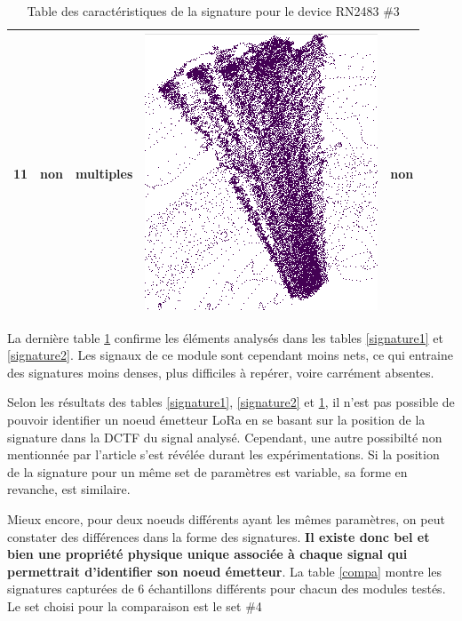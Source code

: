 \begin{table}[h]
\begin{tabular}{|c|c|c|c|c|}
\hline
11 & non & multiples & \includegraphics[scale=0.2]{images/set33.png}  & non \\
\hline
\end{tabular}
\caption{Table des caractéristiques de la signature pour le device RN2483 \#3}
\label{signature3}
\end{table}

La dernière table \ref{signature3} confirme les éléments analysés dans les tables \ref{signature1} et \ref{signature2}. Les signaux de ce module sont cependant moins nets, ce qui entraine des signatures moins denses, plus difficiles à repérer, voire carrément absentes.

\vspace{0.1cm}

Selon les résultats des tables \ref{signature1}, \ref{signature2} et \ref{signature3}, il n'est pas possible de pouvoir identifier un noeud émetteur \ac{LoRa} en se basant sur la position de la signature dans la \ac{DCTF} du signal analysé. Cependant, une autre possibilté non mentionnée par l'article s'est révélée durant les expérimentations. Si la position de la signature pour un même set de paramètres est variable, sa forme en revanche, est similaire. 

Mieux encore, pour deux noeuds différents ayant les mêmes paramètres, on peut constater des différences dans la forme des signatures. \textbf{Il existe donc bel et bien une propriété physique unique associée à chaque signal qui permettrait d'identifier son noeud émetteur}. La table \ref{compa} montre les signatures capturées de 6 échantillons différents pour chacun des modules testés. Le set choisi pour la comparaison est le set \#4

